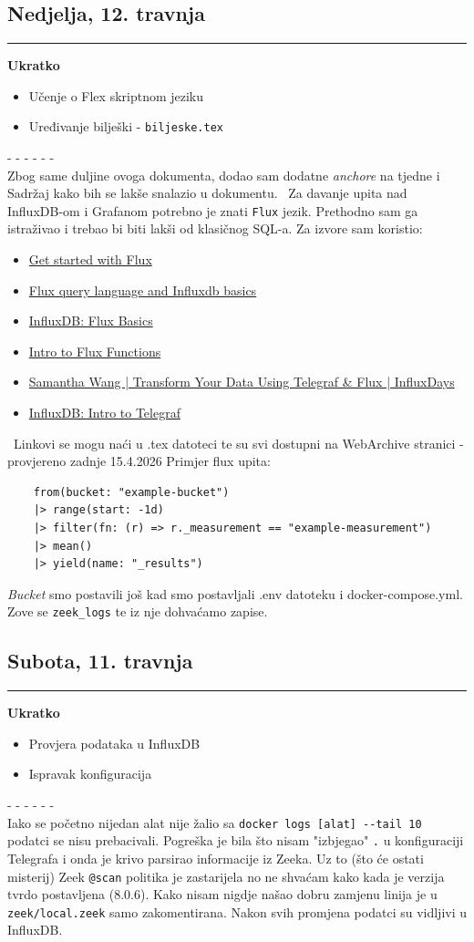 \documentclass[12pt, a4paper]{article}
\newcommand{\dan}[1]{
    \subsection*{#1}
    \vspace{-0.5em} 
    \hrule \vspace{0.5em} 
}
\begin{document}
\dan{Nedjelja, 12. travnja}
\textbf{Ukratko}
\begin{itemize}
    \item Učenje o Flex skriptnom jeziku
    \item Uređivanje bilješki - \lstinline|biljeske.tex|
\end{itemize}
- - - - - - \\
Zbog same duljine ovoga dokumenta, dodao sam dodatne \textit{anchore} na tjedne i Sadržaj kako 
bih se lakše snalazio u dokumentu. \
Za davanje upita nad InfluxDB-om i Grafanom potrebno je znati \lstinline|Flux| jezik.
Prethodno sam ga istraživao i trebao bi biti lakši od klasičnog SQL-a.
Za izvore sam koristio:
\begin{itemize}
    \item \href{https://docs.influxdata.com/flux/v0/get-started/}{Get started with Flux}
    \item \href{https://www.youtube.com/watch?v=sjfBPPBw8k8}{Flux query language and Influxdb basics}
    \item \href{https://www.youtube.com/watch?v=LbQCYNGcWUU}{InfluxDB: Flux Basics}
    \item \href{https://www.youtube.com/watch?v=8gt_MdCFw3k}{Intro to Flux Functions}
    \item \href{https://www.youtube.com/watch?v=8jsoWCZZ5bk}{Samantha Wang | Transform Your Data Using Telegraf \& Flux | InfluxDays}
    \item \href{https://www.youtube.com/watch?v=sF2inT5tlTg}{InfluxDB: Intro to Telegraf}
\end{itemize}
\
Linkovi se mogu naći u .tex datoteci te su svi dostupni na WebArchive stranici - provjereno zadnje 15.4.2026
Primjer flux upita:
\begin{lstlisting}
    from(bucket: "example-bucket")
    |> range(start: -1d)
    |> filter(fn: (r) => r._measurement == "example-measurement")
    |> mean()
    |> yield(name: "_results")
\end{lstlisting}
\textit{Bucket} smo postavili još kad smo postavljali .env datoteku i docker-compose.yml. Zove se \lstinline|zeek_logs| te iz nje dohvaćamo
zapise.

\dan{Subota, 11. travnja}
\textbf{Ukratko}
\begin{itemize}
    \item Provjera podataka u InfluxDB
    \item Ispravak konfiguracija
\end{itemize}
- - - - - - \\
Iako se početno nijedan alat nije žalio sa \lstinline|docker logs [alat] --tail 10| podatci se nisu prebacivali.
Pogreška je bila što nisam "izbjegao" \lstinline|.| u konfiguraciji Telegrafa i onda je krivo parsirao informacije iz Zeeka.
Uz to (što će ostati misterij) Zeek \lstinline|@scan| politika je zastarijela no ne shvaćam kako kada je verzija tvrdo postavljena (8.0.6).
Kako nisam nigdje našao dobru zamjenu linija je u \lstinline|zeek/local.zeek| samo zakomentirana.
Nakon svih promjena podatci su vidljivi u InfluxDB.
\end{document}
